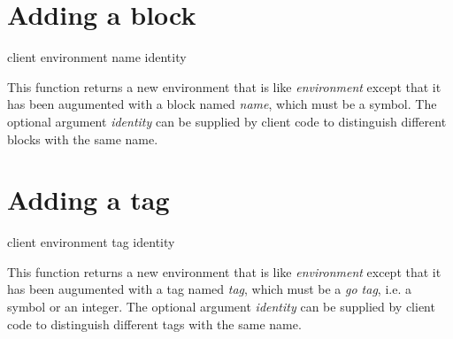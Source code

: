 \section{Adding a block}

{\footnotesize
{} {client environment name \optional identity}
}

This function returns a new environment that is like
\textit{environment} except that it has been augumented with a block
named \textit{name}, which must be a symbol.  The optional argument
\textit{identity} can be supplied by client code to distinguish
different blocks with the same name.

\section{Adding a tag}

{\footnotesize
{} {client environment tag \optional identity}
}

This function returns a new environment that is like
\textit{environment} except that it has been augumented with a tag
named \textit{tag}, which must be a \emph{go tag}, i.e. a symbol or an
integer.  The optional argument \textit{identity} can be supplied by
client code to distinguish different tags with the same name.
